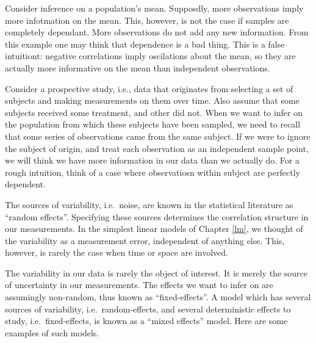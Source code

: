 \documentclass[]{book}
\theoremstyle{definition}
\theoremstyle{definition}
\theoremstyle{definition}
\theoremstyle{remark}
\let\BeginKnitrBlock\begin \let\EndKnitrBlock\end
\begin{document}
\BeginKnitrBlock{example}[Dependent Samples on the Mean]
\protect\hypertarget{exm:dependence}{}{\label{exm:dependence}
{} }Consider inference on a
population's mean. Supposdly, more observations imply more infotmation
on the mean. This, however, is not the case if samples are completely
dependant. More observations do not add any new information. From this
example one may think that dependence is a bad thing. This is a false
intuitiont: negative correlations imply oscilations about the mean, so
they are actually more informative on the mean than independent
observations.
\EndKnitrBlock{example}

\BeginKnitrBlock{example}[Repeated Measures]
\protect\hypertarget{exm:repeated-measures}{}{\label{exm:repeated-measures}
{} }Consider a prospective study, i.e.,
data that originates from selecting a set of subjects and making
measurements on them over time. Also assume that some subjects received
some treatment, and other did not. When we want to infer on the
population from which these subjects have been sampled, we need to
recall that some series of observations came from the same subject. If
we were to ignore the subject of origin, and treat each observation as
an independent sample point, we will think we have more information in
our data than we actually do. For a rough intuition, think of a case
where observatiosn within subject are perfectly dependent.
\EndKnitrBlock{example}

The sources of variability, i.e.~noise, are known in the statistical
literature as ``random effects''. Specifying these sources determines
the correlation structure in our measurements. In the simplest linear
models of Chapter \ref{lm}, we thought of the variability as a
measurement error, independent of anything else. This, however, is
rarely the case when time or space are involved.

The variability in our data is rarely the object of interest. It is
merely the source of uncertainty in our measurements. The effects we
want to infer on are assumingly non-random, thus known as
``fixed-effects''. A model which has several sources of variability,
i.e.~random-effects, and several deterministic effects to study,
i.e.~fixed-effects, is known as a ``mixed effects'' model. Here are some
examples of such models.
\end{document}
